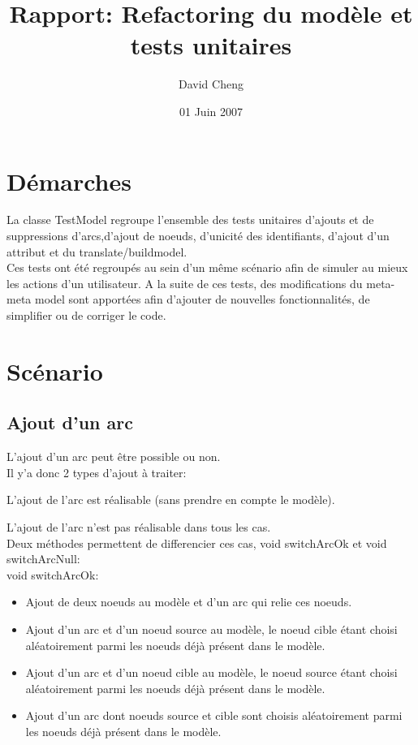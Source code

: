 \documentclass{article}
\title{Rapport: Refactoring du mod\`ele et tests unitaires}
\author{David Cheng}
\date{01 Juin 2007}
\begin{document}
\maketitle
\section{D\'emarches}

La classe TestModel regroupe l'ensemble des tests unitaires d'ajouts et de suppressions d'arcs,d'ajout de noeuds, d'unicit\'e des identifiants, 
d'ajout d'un attribut et du translate/buildmodel.\\

Ces tests ont \'et\'e regroup\'es au sein d'un m\^eme sc\'enario afin de simuler au mieux les actions d'un utilisateur.
A la suite de ces tests, des modifications du meta-meta model sont apport\'ees afin d'ajouter 
de nouvelles fonctionnalit\'es, de simplifier ou de corriger le code.


\section{Sc\'enario}
\subsection{Ajout d'un arc}

L'ajout d'un arc peut \^etre possible ou non.\\

Il y'a donc 2 types d'ajout \`a traiter:

L'ajout de l'arc est r\'ealisable (sans prendre en compte le mod\`ele).

L'ajout de l'arc n'est pas r\'ealisable dans tous les cas.\\

Deux m\'ethodes permettent de differencier ces cas, void switchArcOk et void switchArcNull:\\

void switchArcOk:

\begin{itemize}
\item Ajout de deux noeuds au mod\`ele et d'un arc qui relie ces noeuds.

\item Ajout d'un arc et d'un noeud source au mod\`ele, le noeud cible \'etant 
choisi al\'eatoirement parmi les noeuds d\'ej\`a pr\'esent dans le mod\`ele.

\item Ajout d'un arc et d'un noeud cible au mod\`ele, le noeud source \'etant 
choisi al\'eatoirement parmi les noeuds d\'ej\`a pr\'esent dans le mod\`ele.

\item Ajout d'un arc dont noeuds source et cible sont choisis al\'eatoirement 
parmi les noeuds d\'ej\`a pr\'esent dans le mod\`ele.\\
\end{itemize}
\end{document}
